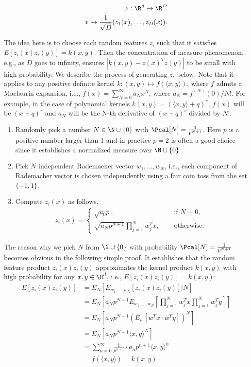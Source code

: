\begin{align*}
z: \R^d\to \R^D\\
x\mapsto \frac{1}{\sqrt{D}} (z_1(x), \ldots, z_D(x)).
\end{align*}

The idea here is to choose each random features $z_i$ such that it satisfies $E[z_i(x)z_i(y)] = k(x, y)$. Then the concentration of measure phenomenon, e.g., as $D$ goes to infinity, ensures $|k(x, y) - z(x)^Tz(y)|$ to be small with high probability. We describe the process of generating $z_i$ below. Note that it applies to any positive definite kernel $k: (x, y) \mapsto f(\langle x, y \rangle)$, where $f$ admits a Maclaurin expansion, i.e., $f(x) = \sum_{N=0}^{\infty} a_N x^N$, where $a_N = f^{(N)}(0) / N!$. For example, in the case of polynomial kernels $k(x,y)=(\langle x,y\rangle+q)^r$, $f(x)$ will be $(x + q)^r$ and $a_N$ will be the N-th derivative of $(x + q)^r$ divided by $N!$.

\begin{enumerate}
	\item Randomly pick a number $N \in \N \cup \{0\}$ with $\Pcal[N] = \frac{1}{p^{N+1}}$. Here $p$ is a positive number larger than 1 and in practice $p=2$ is often a good choice since it establishes a normalized measure over $\N \cup \{0\}$ \cite{KK12}.
	\item Pick $N$ independent Rademacher vector $w_1, ..., w_N$, i.e., each component of Rademacher vector is chosen independently using a fair coin toss from the set $\{-1, 1\}$.
	\item Compute $z_i(x)$ as follows,
	\begin{align}
	\label{equ:svm-zi}
		z_i(x) =
		\begin{cases}
			\sqrt{a_0p}, &\quad \mbox{ if } N = 0,\\
			\sqrt{a_Np^{N+1}}\prod_{j=1}^N w_j^Tx, &\quad \mbox{ otherwise. }
		\end{cases}
	\end{align}
\end{enumerate}

The reason why we pick $N$ from $\N \cup \{0\}$ with probability $\Pcal[N] = \frac{1}{p^{N+1}}$ becomes obvious in the following simple proof. It establishes that the random feature product $z_i(x)z_i(y)$ approximates the kernel product $k(x, y)$ with high probability for any $x, y \in \R^d$, i.e., $E[z_i(x)z_i(y)] = k(x, y)$:
\begin{align*}
    E[z_i(x)z_i(y)]
    &= E_N [E_{w_1, ..., w_N} [z_i(x)z_i(y)] | N]  \\
    &= E_N[a_N p^{N+1} E_{w_1, ..., w_N} [\prod_{j=1}^N w_j^T x \prod_{j=1}^N w_j^T y]] \\
    &= E_N[a_N p^{N+1} (E_{w} [w^Tx \cdot w^Ty])^N] \\
    &= E_N[a_N p^{N+1} \langle x, y \rangle^N] \\
    &= \sum_{n=0}^{\infty} \frac{1}{p^{n+1}} \cdot a_n p^{n+1} \langle x, y \rangle^n \\
    &= f(\langle x, y \rangle) = k(x, y)
\end{align*}

